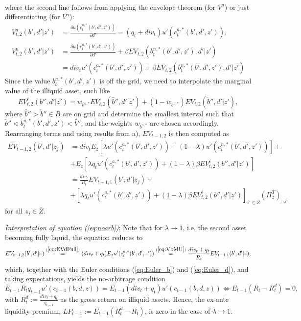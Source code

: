 \documentclass[11pt]{article} %
\begin{document}
\begin{enumerate}[a.)]
\begin{align}
\end{align}
where the second line follows from applying the envelope theorem (for $V^a$) or just differentiating (for $V^n$):
\begin{align}
V^a_{t,2}(b',d'|z') &= \frac{\partial u(c_t^{a,*}(b',d',z'))}{\partial d'} = (q_t + div_t) u'(c^{a,*}_t(b',d',z')),\\
V^n_{t,2}(b',d'|z') &= \frac{\partial u(c_t^{n,*}(b',d',z'))}{\partial d'} + \beta EV_{t,2}(b^{n,*}_t(b',d',z'),d'|z')\\
&= div_t u'(c^{a,*}_t(b',d',z')) + \beta EV_{t,2}(b^{n,*}_t(b',d',z'),d'|z')
\end{align}
Since the value $b_t^{n,*}(b',d',z')$ is off the grid, we need to interpolate the marginal value of the illiquid asset, such like
\begin{equation}
EV_{t,2}^i(b'',d'|z') = w_{b^{n,*}} EV_{t,2}(\hat{b}'',d'|z') + (1-w_{b^{n,*}}) EV_{t,2}(\check{b}'',d'|z'),
\end{equation}
where $\hat{b}''>\check{b}''\in \overline{B}$ are on grid and determine the smallest interval such that $\check{b}''<b_t^{n,*}(b',d',z')<\hat{b}''$, and the weights $w_{b^{n,*}}$ are chosen accordingly. Rearranging terms and using results from a), $EV_{t-1,2}$ is then computed as
\begin{align}
EV_{t-1,2}(b',d'|z_j)& = div_t E_z[\lambda u'(c^{a,*}_t(b',d',z'))+(1-\lambda)u'(c^{n,*}_t(b',d',z'))] + \nonumber \\
&+ E_z  \left[ \lambda q_t u'(c_t^{a,*}(b',d',z')) + (1-\lambda) \beta EV^i_{t,2}(b'',d'|z') \right] \nonumber\\
&= \frac{div_t}{R_t} EV_{t-1,1}(b',d'|z_j)+\nonumber \\
&+ \left[ \lambda q_t u'(c_t^{a,*}(b',d',z')) + (1-\lambda) \beta EV^i_{t,2}(b'',d'|z') \right]_{z'\in \overline{Z}}\left(\Pi_z^T\right)_{\cdot,j} \label{eq:noarb} 
\end{align}
for all $z_j\in \overline{Z}$.
\end{enumerate}
\textit{Interpretation of equation (\ref{eq:noarb})}: Note that for $\lambda \rightarrow 1$, i.e. the second asset becoming fully liquid, the equation reduces to
\begin{equation}
EV_{t-1,2}(b',d'|z) \overset{(\ref{eq:EVdFull})}{=} (div_t + q_t) E_z u'(c^{a,*}_t(b',d',z')) \overset{(\ref{eq:VbMU})}{=} \frac{div_t+q_t}{R_t} EV_{t-1,1}(b',d'|z),
\end{equation}
which, together with the Euler conditions (\ref{eq:Euler_b}) and (\ref{eq:Euler_d}), and taking expectations, yields the no-arbitrage condition
\begin{equation}
E_{t-1} R_t q_{t-1} u'(c_{t-1}(b,d,z)) = E_{t-1} (div_t+q_t) u'(c_{t-1}(b,d,z)) \Leftrightarrow E_{t-1}\left(R_t -R_t^d\right)=0,
\end{equation}
with $R_t^d := \frac{div_t+q_t}{q_{t-1}}$ as the gross return on illiquid assets. Hence, the ex-ante liquidity premium, $LP_{t-1} := E_{t-1}\left( R_t^d - R_t\right)$, is zero in the case of $\lambda \rightarrow 1$.
\end{document}
